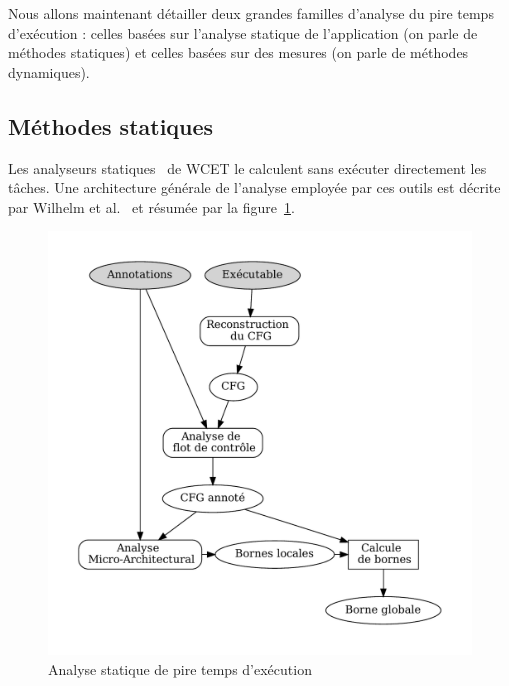 
Nous allons maintenant détailler deux grandes familles d'analyse du pire temps d'exécution : celles basées sur l'analyse statique de l'application (on parle de méthodes statiques) et celles basées sur des mesures (on parle de méthodes dynamiques).

\subsection{Méthodes statiques}

Les analyseurs statiques~\cite{ferdinand2004ait,lisper2014sweet,rapitime,ballabriga2010otawa,li2007chronos} de WCET le calculent sans exécuter directement les tâches. 
Une architecture générale de l'analyse employée par ces outils est décrite par Wilhelm et al.~\cite{wilhelm2009memory} et résumée par la figure~\ref{fig:process_wcet}.

\begin{figure}[!h]
	\centering
	\includegraphics[width=\linewidth]{graphics/figures/wcet_static.pdf}
	\caption{\label{fig:process_wcet}Analyse statique de pire temps d'exécution}
\end{figure}

